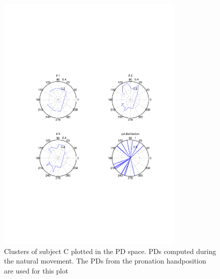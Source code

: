 \begin{figure}[ht]
    \centering
        \includegraphics[width=0.8\textwidth]{images/center_rose_chalva.pdf}
    \caption{Clusters of subject C plotted in the PD space. PDs computed during the natural movement. The PDs from the pronation handposition are used for this plot}
    \label{sg:fig:images_center_rose_chalva}
\end{figure}
